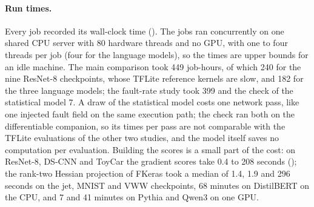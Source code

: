 \paragraph{Run times.} Every job recorded its wall-clock time (). The jobs ran concurrently on one shared CPU server with 80 hardware threads and no GPU, with one to four threads per job (four for the language models), so the times are upper bounds for an idle machine. The main comparison took 449 job-hours, of which 240 for the nine ResNet-8 checkpoints, whose TFLite reference kernels are slow, and 182 for the three language models; the fault-rate study took 399 and the check of the statistical model 7. A draw of the statistical model costs one network pass, like one injected fault field on the same execution path; the check ran both on the differentiable companion, so its times per pass are not comparable with the TFLite evaluations of the other two studies, and the model itself saves no computation per evaluation. Building the scores is a small part of the cost: on ResNet-8, DS-CNN and ToyCar the gradient scores take 0.4 to 208 seconds (); the rank-two Hessian projection of FKeras took a median of 1.4, 1.9 and 296 seconds on the jet, MNIST and VWW checkpoints, 68 minutes on DistilBERT on the CPU, and 7 and 41 minutes on Pythia and Qwen3 on one GPU.

